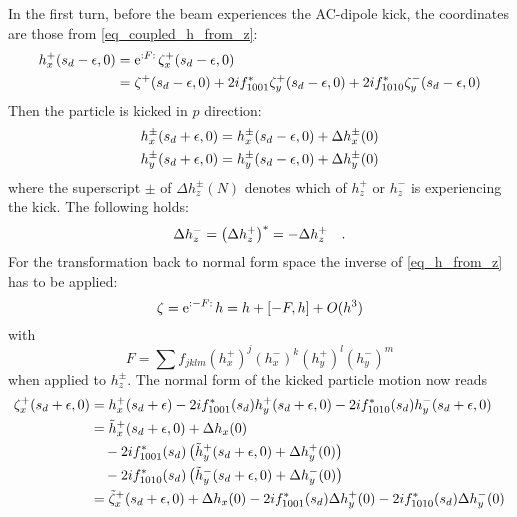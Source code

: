 In the first turn, before the beam experiences the AC-dipole kick, the coordinates are those from
\eqref{eq_coupled_h_from_z}:
%
\begin{align}
  h_x^+(s_d-\epsilon, 0) &=  \text{e}^{{:}F{:}\,} \zeta_x^+(s_d-\epsilon, 0)\notag \\
  &=  \zeta^+(s_d-\epsilon,0)
    + 2if_{1001}^*\zeta_y^+(s_d-\epsilon, 0)
    + 2if_{1010}^*\zeta_y^-(s_d-\epsilon,0)
\end{align}
%
Then the particle is kicked in $p$ direction:
%
\begin{align}
  h_x^\pm(s_d+\epsilon, 0) =  h_x^\pm(s_d - \epsilon,0) + \Delta h_x^\pm(0)\notag \\
  h_y^\pm(s_d+\epsilon, 0) =  h_y^\pm(s_d - \epsilon,0) + \Delta h_y^\pm(0)
\end{align}
%
where the superscript $\pm$ of $\Delta h_z^\pm(N)$ denotes which of $h_z^+$ or $h_z^-$ is experiencing
the kick. The following holds:
%
\begin{equation}
    \Delta h_z^- = \left(\Delta h_z^+\right)^* = -\Delta h_z^+
    \quad .
\end{equation}
%
For the transformation back to normal form space the inverse of \eqref{eq_h_from_z} has to be applied:
%
\begin{equation}
  \zeta = \text{e}^{{:}-F{:}\,} h = h + [-F,h] + O(h^3)
  \label{eq_coupled_h_after_kick}
\end{equation}
%
with
%
\begin{equation}
  F = \sum f_{jklm}\left( h_x^+ \right)^j \left( h_x^- \right)^k \left( h_y^+ \right)^l \left( h_y^- \right)^m
\end{equation}
%
when applied to $h_z^\pm$.
The normal form of the kicked particle motion now reads
%
\begin{align}
    \zeta_x^+(s_d+\epsilon, 0)
        &= h_x^+(s_d+\epsilon)
            - 2if_{1001}^*(s_d) h_y^+(s_d+\epsilon, 0)
            - 2if_{1010}^*(s_d) h_y^-(s_d+\epsilon, 0)
    \notag\\
        &= \tilde{h}_x^+(s_d+\epsilon,0) + \Delta h_x(0)
            \notag \\ &\quad - 2if_{1001}^*(s_d) \left(\tilde{h}_y^+(s_d+\epsilon, 0) + \Delta h_y^+(0)\right)
            \notag \\ &\quad - 2if_{1010}^*(s_d) \left(\tilde{h}_y^-(s_d+\epsilon, 0) + \Delta h_y^-(0)\right)
    \notag \\
        &= \tilde{\zeta}_x^+(s_d+\epsilon, 0) + \Delta h_x(0)
            - 2if_{1001}^*(s_d) \Delta h_y^+(0)
            - 2if_{1010}^*(s_d) \Delta h_y^-(0)
\end{align}
